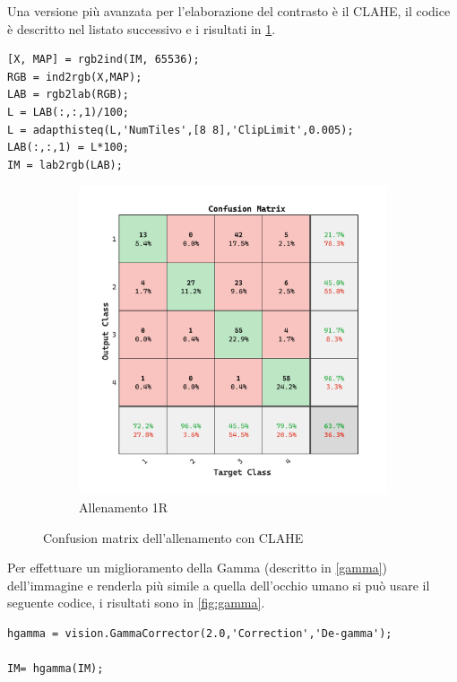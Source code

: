Una versione più avanzata per l'elaborazione del contrasto è il CLAHE, il codice è descritto nel listato successivo e i risultati in \cref{fig:clahe}. 

\begin{lstlisting}
[X, MAP] = rgb2ind(IM, 65536);
RGB = ind2rgb(X,MAP);
LAB = rgb2lab(RGB);
L = LAB(:,:,1)/100;
L = adapthisteq(L,'NumTiles',[8 8],'ClipLimit',0.005);
LAB(:,:,1) = L*100;
IM = lab2rgb(LAB);
\end{lstlisting}

\begin{figure}[ht]
    \centering
    \begin{subfigure}{0.45\textwidth}
        \includegraphics[width=\textwidth]{addestramento-rete-neurale/one-clahe.pdf}
        \caption{Allenamento 1R} 
    \end{subfigure}
    \caption{Confusion matrix dell'allenamento con  CLAHE}
    \label{fig:clahe}
\end{figure}

Per effettuare un miglioramento della Gamma (descritto in \cref{gamma}) dell'immagine e renderla più simile a quella dell'occhio umano si può usare il seguente codice, i risultati sono in \cref{fig:gamma}.

\begin{lstlisting}
hgamma = vision.GammaCorrector(2.0,'Correction','De-gamma');

IM= hgamma(IM);
\end{lstlisting}

